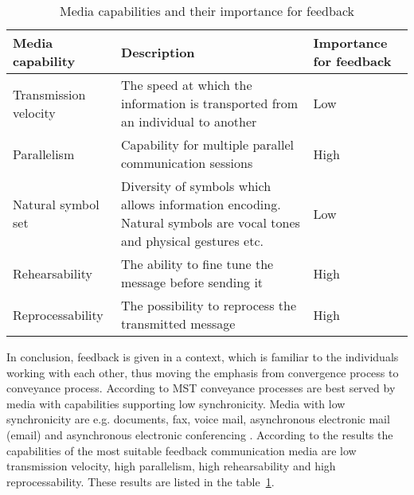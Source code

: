 \documentclass[conference]{IEEEtran}
\begin{document}
\begin{table}[!h]
\renewcommand{\arraystretch}{1.3}
\caption{Media capabilities and their importance for feedback}
\label{table:capabilities}
\centering
\begin{tabular}{|p{1.8cm}|p{4.2cm}|p{1.3cm}|}
\hline
\textbf{Media \newline capability} & \textbf{Description} & \textbf{Importance for \newline feedback}\\
\hline
Transmission \newline velocity & The speed at which the information is transported from an individual to another & Low\\
\hline
Parallelism & Capability for multiple parallel communication sessions & High\\
\hline
Natural symbol set & Diversity of symbols which allows information encoding. Natural symbols are vocal tones and physical gestures etc. & Low\\
\hline
Rehearsability & The ability to fine tune the message before sending it & High\\
\hline
Reprocessability & The possibility to reprocess the transmitted message & High\\
\hline
\end{tabular}
\end{table}

In conclusion, feedback is given in a context, which is familiar to the individuals working with each other, thus moving the emphasis from convergence process to conveyance process. According to MST conveyance processes are best served by media with capabilities supporting low synchronicity. Media with low synchronicity are e.g. documents, fax, voice mail, asynchronous electronic mail (email) and asynchronous electronic conferencing \cite{2008dennis}. According to the results the capabilities of the most suitable feedback communication media are low transmission velocity, high parallelism, high rehearsability and high reprocessability. These results are listed in the table~\ref{table:capabilities}.
\end{document}

